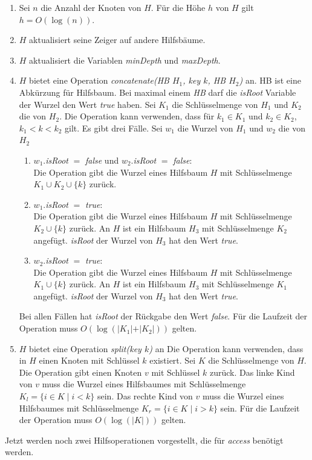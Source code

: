 \documentclass[a4paper,12pt]{article}
\begin{document}
\begin{enumerate}
	\item Sei $n$ die Anzahl der Knoten von $H$. Für die Höhe $h$ von $H$ gilt $h = O\left(\log \left(n\right)\right)$.
	\item $H$ aktualisiert seine Zeiger auf andere Hilfsbäume.
	\item $H$ aktualisiert die Variablen  \textit{minDepth} und \textit{maxDepth}.
	\item $H$ bietet eine Operation \textit{concatenate(HB $H_1$, key $k$, HB  $H_2$)} an. HB ist eine Abkürzung für Hilfsbaum. Bei maximal einem \textit{HB}  darf die \textit{isRoot} Variable der Wurzel den Wert \textit{true} haben. Sei $K_1$ die Schlüsselmenge von $H_1$ und $K_2$ die von $H_2$. Die Operation kann verwenden, dass für $k_1 \in K_1$ und $k_2 \in K_2$, $k_1 < k < k_2$ gilt. Es gibt drei Fälle. Sei $w_1$ die Wurzel von $H_1$ und $w_2$ die von $H_2$
	\begin{enumerate}
		\item $w_1$.\textit{isRoot} $=$ \textit{false} und $w_2$.\textit{isRoot} $=$ \textit{false}:\\
		Die Operation gibt die Wurzel eines Hilfsbaum $H$ mit Schlüsselmenge $K_1 \cup K_2 \cup \{k\} $ zurück.
		\item $w_1$.\textit{isRoot} $=$ \textit{true}:\\	
		Die Operation gibt die Wurzel eines Hilfsbaum $H$ mit Schlüsselmenge $K_2 \cup \{k\} $ zurück. An $H$ ist ein Hilfsbaum $H_3$ mit Schlüsselmenge $K_2$ angefügt. \textit{isRoot} der Wurzel von $H_3$ hat den Wert \textit{true}.
		\item $w_2$.\textit{isRoot} $=$ \textit{true}:\\	
		Die Operation gibt die Wurzel eines Hilfsbaum $H$ mit Schlüsselmenge $K_1 \cup \{k\} $ zurück. An $H$ ist ein Hilfsbaum $H_3$ mit Schlüsselmenge $K_1$ angefügt. \textit{isRoot} der Wurzel von $H_3$ hat den Wert \textit{true}.	 
	\end{enumerate}
	Bei allen Fällen hat \textit{isRoot} der Rückgabe den Wert \textit{false}.
	Für die Laufzeit der Operation muss $O\left(\log \left(\vert K_1 \vert + \vert K_2 \vert\right)\right)$ gelten.
	\item $H$ bietet eine Operation \textit{split(key $k$)} an Die Operation kann verwenden, dass in $H$ einen Knoten mit Schlüssel $k$ existiert. Sei $K$ die Schlüsselmenge von $H$. Die Operation gibt einen Knoten $v$ mit Schlüssel $k$ zurück. Das linke Kind von $v$ muss die Wurzel eines Hilfsbaumes mit Schlüsselmenge ${K_l=\{i\in K \mid  i <k\}}$ sein. Das rechte Kind von $v$ muss die Wurzel eines Hilfsbaumes mit Schlüsselmenge ${K_r=\{i\in K \mid  i > k\}}$ sein. Für die Laufzeit der Operation muss $O\left(\log \left(\vert K \vert\right) \right)$ gelten.
\end{enumerate} 
Jetzt werden noch zwei Hilfsoperationen vorgestellt, die für \textit{access} benötigt werden.\\
\end{document}
